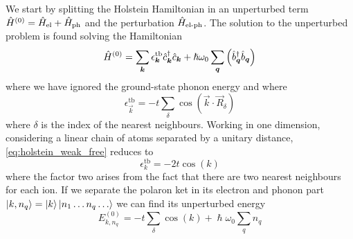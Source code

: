 We start by splitting the Holstein Hamiltonian in an unperturbed term $\hat{H}^{(0)} = \hat{H}_\text{el} + \hat{H}_\text{ph}$ and the perturbation $\hat{H}_\text{el-ph}$.
The solution to the unperturbed problem is found solving the Hamiltonian
\begin{equation}
    \hat{H}^{(0)} = \sum_{\mathbf{\boldsymbol{k}}} \epsilon_{\mathbf{\boldsymbol{k}}}^\text{tb} \hat{c}^\dagger_{\mathbf{\boldsymbol{k}}}\hat{c}_{\mathbf{\boldsymbol{k}}} + \hslash \omega_0\sum_{\mathbf{\boldsymbol{q}}}  \left( \hat{b}^\dagger_{\mathbf{\boldsymbol{q}}} \hat{b}_{\mathbf{\boldsymbol{q}}} \right)
\end{equation}
where we have ignored the ground-state phonon energy and where
\begin{equation} \label{eq:holstein_weak_free}
    \epsilon_\vec{k}^\text{tb} = -t \sum_{    \delta} \cos(\vec{k}\cdot\vec{R}_\delta)
\end{equation}
where $\delta$ is the index of the nearest neighbours. Working in one dimension, considering a linear chain of atoms separated by a unitary distance, \cref{eq:holstein_weak_free} reduces to
\begin{equation} \label{eq:holstein_ground}
    \epsilon_k^\text{tb} = -2t \cos(k)
\end{equation}
where the factor two arises from the fact that there are two nearest neighbours for each ion.
If we separate the polaron ket in its electron and phonon part
$\ket{k, n_q} = \ket{k}\ket{n_1\dots n_q \dots}$ we can find its unperturbed energy
\begin{equation}
    E_{k, n_q}^{(0)} = -t \sum_{    \delta} \cos(k) + \hslash\omega_0 \sum_q n_q
\end{equation}


